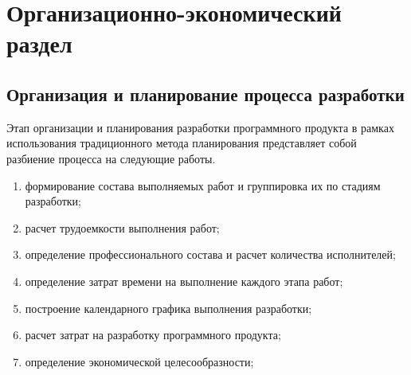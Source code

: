 \chapter{Организационно-экономический раздел}
\label{cha:econom}

\section{Организация и планирование процесса разработки}
Этап организации и планирования разработки программного продукта в рамках
использования традиционного метода планирования представляет собой разбиение
процесса на следующие работы.
\begin{enumerate}[1.]
\item формирование состава выполняемых работ и группировка их по стадиям
разработки;
\item расчет трудоемкости выполнения работ;
\item определение профессионального состава и расчет количества исполнителей;
\item определение затрат времени на выполнение каждого этапа работ;
\item построение календарного графика выполнения разработки;
\item расчет затрат на разработку программного продукта;
\item определение экономической целесообразности;
\end{enumerate}

